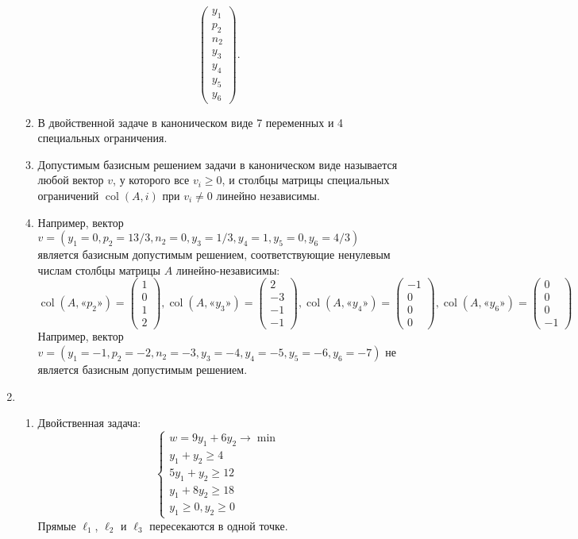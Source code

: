 \documentclass[12pt]{article}
\DeclareMathOperator{\col}{col}
\begin{document}
\begin{enumerate}
\begin{enumerate}
\[\begin{pmatrix}
        y_1 \\
        p_2 \\
        n_2 \\
        y_3 \\
        y_4 \\
        y_5 \\
        y_6
      \end{pmatrix}.
      \]
    \item В двойственной задаче в каноническом виде 7 переменных и 4 специальных ограничения. 
    \item Допустимым базисным решением задачи в каноническом виде называется любой вектор $v$, 
    у которого все $v_i \geq 0$, и столбцы матрицы специальных ограничений $\col(A, i)$ при $v_i \neq 0$ линейно независимы.
\item Например, вектор $v = (y_1 = 0, p_2 = 13/3,  n_2 = 0, y_3 = 1/3, y_4 =1, y_5 = 0, y_6 = 4/3)$ является базисным допустимым решением,
соответствующие ненулевым числам столбцы матрицы $A$ линейно-независимы:
\[
\col(A, \text{«}p_2\text{»}) = \begin{pmatrix}
  1 \\ 0 \\ 1 \\ 2 
\end{pmatrix},
\col(A, \text{«}y_3\text{»}) = \begin{pmatrix}
  2 \\ -3 \\ -1 \\ -1 
\end{pmatrix},
\col(A, \text{«}y_4\text{»}) = \begin{pmatrix}
  -1 \\ 0 \\ 0 \\ 0
\end{pmatrix},
\col(A, \text{«}y_6\text{»}) = \begin{pmatrix}
  0 \\ 0 \\ 0 \\ -1
\end{pmatrix}
\]
Например, вектор $v = (y_1=-1, p_2=-2, n_2=-3, y_3=-4, y_4=-5, y_5=-6, y_6=-7)$ не является базисным допустимым решением. 
\end{enumerate}
    
    
    \item 
    \begin{enumerate}
        \item 
    Двойственная задача:
    \[
    \begin{cases}
    w = 9y_1 + 6y_2 \to \min \\
    y_1 + y_2 \geq 4 \\
    5y_1 + y_2 \geq 12 \\
    y_1 + 8y_2 \geq 18 \\
    y_1 \geq 0, y_2 \geq 0 
    \end{cases}
    \]
    Прямые $\ell_1$, $\ell_2$ и $\ell_3$ пересекаются в одной точке. 
    

\end{enumerate}
\end{enumerate}
\end{document}
